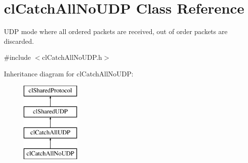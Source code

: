 \hypertarget{classcl_catch_all_no_u_d_p}{
\section{clCatchAllNoUDP Class Reference}
\label{classcl_catch_all_no_u_d_p}
}


UDP mode where all ordered packets are received, out of order packets are discarded.  




{\ttfamily \#include $<$clCatchAllNoUDP.h$>$}

Inheritance diagram for clCatchAllNoUDP:\begin{figure}[H]
\begin{center}
\leavevmode
\includegraphics[height=4.000000cm]{classcl_catch_all_no_u_d_p}
\end{center}
\end{figure}
